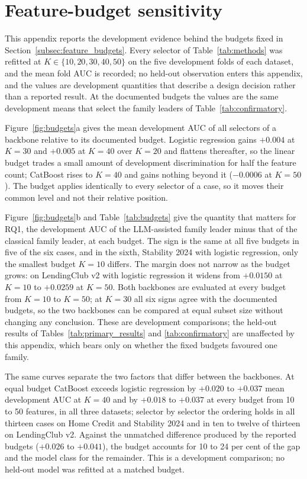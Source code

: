 \documentclass[final,5p,twocolumn]{elsarticle}
\newcommand{\Kfeat}{K}
\begin{document}
\section{Feature-budget sensitivity}
\label{app:budgets}
\setcounter{table}{0}\setcounter{figure}{0}

This appendix reports the development evidence behind the budgets fixed in Section~\ref{subsec:feature_budgets}. Every selector of Table~\ref{tab:methods} was refitted at $\Kfeat \in \{10,20,30,40,50\}$ on the five development folds of each dataset, and the mean fold AUC is recorded; no held-out observation enters this appendix, and the values are development quantities that describe a design decision rather than a reported result. At the documented budgets the values are the same development means that select the family leaders of Table~\ref{tab:confirmatory}.

Figure~\ref{fig:budgets}a gives the mean development AUC of all selectors of a backbone relative to its documented budget. Logistic regression gains $+0.004$ at $\Kfeat=30$ and $+0.005$ at $\Kfeat=40$ over $\Kfeat=20$ and flattens thereafter, so the linear budget trades a small amount of development discrimination for half the feature count; CatBoost rises to $\Kfeat=40$ and gains nothing beyond it ($-0.0006$ at $\Kfeat=50$). The budget applies identically to every selector of a case, so it moves their common level and not their relative position.

Figure~\ref{fig:budgets}b and Table~\ref{tab:budgets} give the quantity that matters for RQ1, the development AUC of the LLM-assisted family leader minus that of the classical family leader, at each budget. The sign is the same at all five budgets in five of the six cases, and in the sixth, Stability 2024 with logistic regression, only the smallest budget $\Kfeat=10$ differs. The margin does not narrow as the budget grows: on LendingClub v2 with logistic regression it widens from $+0.0150$ at $\Kfeat=10$ to $+0.0259$ at $\Kfeat=50$. Both backbones are evaluated at every budget from $\Kfeat=10$ to $\Kfeat=50$; at $\Kfeat=30$ all six signs agree with the documented budgets, so the two backbones can be compared at equal subset size without changing any conclusion. These are development comparisons; the held-out results of Tables~\ref{tab:primary_results} and \ref{tab:confirmatory} are unaffected by this appendix, which bears only on whether the fixed budgets favoured one family.

The same curves separate the two factors that differ between the backbones. At equal budget CatBoost exceeds logistic regression by $+0.020$ to $+0.037$ mean development AUC at $\Kfeat=40$ and by $+0.018$ to $+0.037$ at every budget from 10 to 50 features, in all three datasets; selector by selector the ordering holds in all thirteen cases on Home Credit and Stability 2024 and in ten to twelve of thirteen on LendingClub v2. Against the unmatched difference produced by the reported budgets ($+0.026$ to $+0.041$), the budget accounts for 10 to 24 per cent of the gap and the model class for the remainder. This is a development comparison; no held-out model was refitted at a matched budget.
\end{document}

